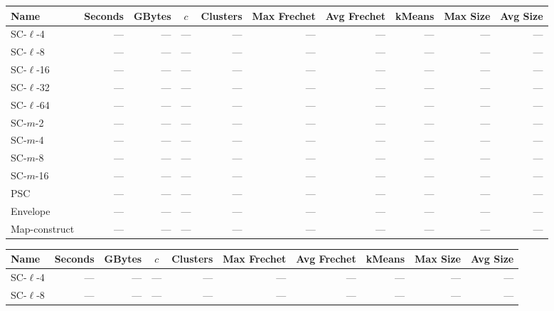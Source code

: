 \documentclass[11pt]{article}
\begin{document}
\clearpage
\newpage 
%
%
\clearpage
\begin{figure} \begin{center}
    \begin{minipage}{\textwidth}
    {
    \begin{tabular}{@{}lrrcrrrrrr@{}}
        \toprule
        Name & Seconds & GBytes & $c$ & Clusters & Max Frechet & Avg Frechet & kMeans & Max Size & Avg Size\\
        \midrule
        SC-$\ell$-4 & --- & --- & --- & --- & --- & --- & --- & --- & ---\\
        SC-$\ell$-8 & --- & --- & --- & --- & --- & --- & --- & --- & ---\\
        SC-$\ell$-16 & --- & --- & --- & --- & --- & --- & --- & --- & ---\\
        SC-$\ell$-32 & --- & --- & --- & --- & --- & --- & --- & --- & ---\\
        SC-$\ell$-64 & --- & --- & --- & --- & --- & --- & --- & --- & ---\\
        SC-$m$-2 & --- & --- & --- & --- & --- & --- & --- & --- & ---\\
        SC-$m$-4 & --- & --- & --- & --- & --- & --- & --- & --- & ---\\
        SC-$m$-8 & --- & --- & --- & --- & --- & --- & --- & --- & ---\\
        SC-$m$-16 & --- & --- & --- & --- & --- & --- & --- & --- & ---\\
        PSC & --- & --- & --- & --- & --- & --- & --- & --- & ---\\
        Envelope & --- & --- & --- & --- & --- & --- & --- & --- & ---\\
        Map-construct & --- & --- & --- & --- & --- & --- & --- & --- & ---\\
        \bottomrule
    \end{tabular}
    }
    {
    \begin{tabular}{@{}lrrcrrrrrr@{}}
        \toprule
        Name & Seconds & GBytes & $c$ & Clusters & Max Frechet & Avg Frechet & kMeans & Max Size & Avg Size\\
        \midrule
        SC-$\ell$-4 & --- & --- & --- & --- & --- & --- & --- & --- & ---\\
        SC-$\ell$-8 & --- & --- & --- & --- & --- & --- & --- & --- & ---\\

\end{tabular}}
\end{minipage}
\end{center}
\end{figure}
\end{document}

